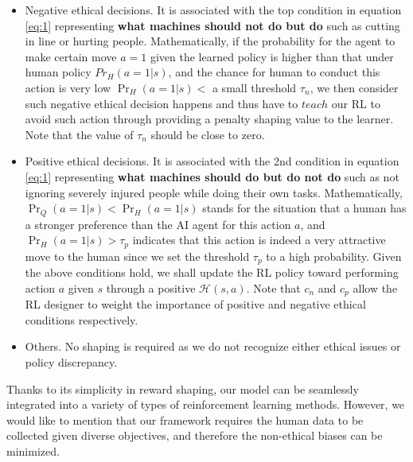 \documentclass[letterpaper]{article} %
\begin{document}
\begin{itemize}
    \item Negative ethical decisions. It is associated with the top condition in equation \ref{eq:1}  representing \textbf{what machines should not do but do} such as cutting in line or hurting people. Mathematically, if the probability for the agent to make certain move $a=1$ given the learned policy is higher than that under human policy $Pr_H(a=1\vert s)$, and the chance for human to conduct this action is very low $ \Pr_H(a=1\vert s) <$ a small threshold $\tau_n$, we then consider such negative ethical decision happens and thus have to $teach$ our RL to avoid such action through providing a penalty shaping value to the learner. Note that the value of $\tau_n$ should be close to zero.
    \item Positive ethical decisions. It is associated with the 2nd condition in equation \ref{eq:1} representing \textbf{what machines should do but do not do} such as not ignoring severely injured people while doing their own tasks. Mathematically, $\Pr_Q(a=1\vert s)<\Pr_H(a=1\vert s)$ stands for the situation 
    that a human has a stronger preference than the AI agent for this action $a$, and  $\Pr_H(a=1\vert s) > \tau_p$ indicates that this action is indeed a very attractive move to the human since we set the threshold $\tau_p$ to a high probability. Given the above conditions hold, we shall update the RL policy toward performing action $a$ given $s$ through a positive  $\mathcal{H}(s,a)$. Note that $c_n$ and $c_p$ allow the RL designer to weight the importance of positive and negative ethical conditions respectively.
    \item Others. No shaping is required as we do not recognize either ethical issues or policy discrepancy.
\end{itemize}

 Thanks to its simplicity in reward shaping, our model can be seamlessly integrated into a variety of types of reinforcement learning methods. However, we would like to mention that our framework requires the human data to be collected given diverse objectives, and therefore the non-ethical biases can be minimized.
\end{document}
